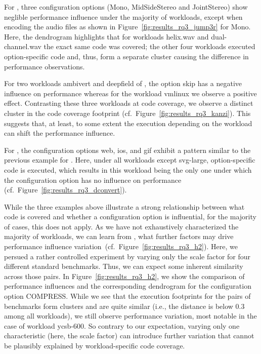 For \jumper, three configuration options (\textsf{Mono, MidSideStereo} and \textsf{JointStereo}) show neglible performance influence under the majority of workloads, except when encoding the audio files as shown in Figure~\ref{fig:results_rq3_jump3r} for \textsf{Mono}. Here, the dendrogram highlights that for workloads \textsf{helix.wav} and \textsf{dual-channel.wav} the exact same code was covered; the other four workloads executed option-specific code and, thus, form a separate cluster causing the difference in performance observations. 

For two workloads \textsf{ambivert} and \textsf{deepfield} of \kanzi, the option \textsf{skip} has a negative influence on performance whereas for the workload \textsf{vmlinux} we observe a positive effect. Contrasting these three workloads at code coverage, we observe a distinct cluster in the code coverage footprint (cf.~Figure~\ref{fig:results_rq3_kanzi}). This suggests that, at least, to some extent the execution depending on the workload can shift the performance influence.

For \dconvert, the configuration options \textsf{web}, \textsf{ios}, and \textsf{gif} exhibit a pattern similar to the previous example for \jumper. Here, under all workloads except \textsf{svg-large}, option-specific code is executed, which results in this workload being the only one under which the configuration option has no influence on performance (cf.~Figure~\ref{fig:results_rq3_dconvert}).

While the three examples above illustrate a strong relationship between what code is covered and whether a configuration option is influential, for the majority of cases, this does not apply. As we have not exhaustively characterized the majority of workloads, we can learn from \htwo, what further factors may drive performance influence variation~(cf.~Figure~\ref{fig:results_rq3_h2}). Here, we persued a rather controlled experiment by varying only the scale factor for four different standard benchmarks. Thus, we can expect some inherent similarity across those pairs. In Figure~\ref{fig:results_rq3_h2}, we show the comparison of performance influences and the corresponding dendrogram for the configuration option \textsf{COMPRESS}. While we see that the execution footprints for the pairs of benchmarks form clusters and are quite similar (i.e., the distance is below 0.3 among all workloads), we still observe performance variation, most notable in the case of workload \textsf{ycsb-600}. So contrary to our expectation, varying only one characteristic (here, the scale factor) can introduce further variation that cannot be plausibly explained by workload-specific code coverage.

